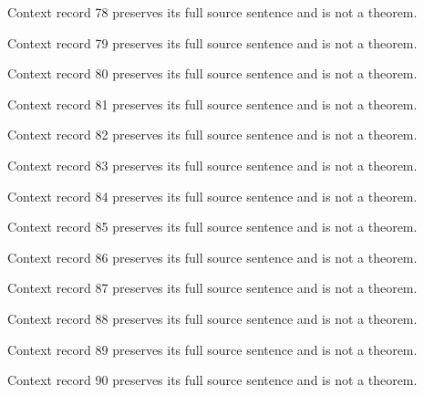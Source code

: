 \documentclass{article}
\begin{document}
\begin{remark}\label{train:context:78}Context record 78 preserves its full source sentence and is not a theorem.\end{remark}
\begin{remark}\label{train:context:79}Context record 79 preserves its full source sentence and is not a theorem.\end{remark}
\begin{remark}\label{train:context:80}Context record 80 preserves its full source sentence and is not a theorem.\end{remark}
\begin{remark}\label{train:context:81}Context record 81 preserves its full source sentence and is not a theorem.\end{remark}
\begin{remark}\label{train:context:82}Context record 82 preserves its full source sentence and is not a theorem.\end{remark}
\begin{remark}\label{train:context:83}Context record 83 preserves its full source sentence and is not a theorem.\end{remark}
\begin{remark}\label{train:context:84}Context record 84 preserves its full source sentence and is not a theorem.\end{remark}
\begin{remark}\label{train:context:85}Context record 85 preserves its full source sentence and is not a theorem.\end{remark}
\begin{remark}\label{train:context:86}Context record 86 preserves its full source sentence and is not a theorem.\end{remark}
\begin{remark}\label{train:context:87}Context record 87 preserves its full source sentence and is not a theorem.\end{remark}
\begin{remark}\label{train:context:88}Context record 88 preserves its full source sentence and is not a theorem.\end{remark}
\begin{remark}\label{train:context:89}Context record 89 preserves its full source sentence and is not a theorem.\end{remark}
\begin{remark}\label{train:context:90}Context record 90 preserves its full source sentence and is not a theorem.\end{remark}
\end{document}
